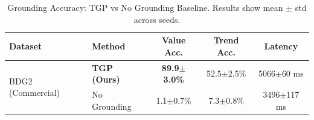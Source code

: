 
\begin{table}[t]
\centering
\caption{Grounding Accuracy: TGP vs No Grounding Baseline.
Results show mean $\pm$ std across seeds.}
\label{tab:grounding_accuracy}
\begin{tabular}{l l c c c}
\toprule
\textbf{Dataset} & \textbf{Method} & \textbf{Value Acc.} & \textbf{Trend Acc.} & \textbf{Latency} \\
\midrule
\multirow{2}{*}{BDG2 (Commercial)} & \textbf{TGP (Ours)} & \textbf{89.9$\pm$3.0\%} & 52.5$\pm$2.5\% & 5066$\pm$60 ms \\
 & No Grounding & 1.1$\pm$0.7\% & 7.3$\pm$0.8\% & 3496$\pm$117 ms 

\bottomrule
\end{tabular}
\end{table}
